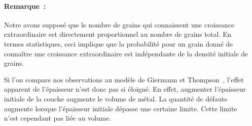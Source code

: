 \paragraph*{Remarque~:} Notre avons supposé que le nombre de grains qui connaissent une croissance extraordinaire est directement proportionnel au nombre de grains total. En termes statistiques, ceci implique que la probabilité pour un grain donné de connaître une croissance extraordinaire est indépendante de la densité initiale de grains.\par  


Si l'on compare nos observations au modèle de Giermann et Thompson~\cite{giermann2005solid, giermann2011requirements}, l'effet apparent de l'épaisseur n'est donc pas si éloigné. En effet, augmenter l'épaisseur initiale de la couche augmente le volume de métal. La quantité de défauts augmente lorsque l'épaisseur initiale dépasse une certaine limite. Cette limite n'est cependant pas liée au volume.\par

